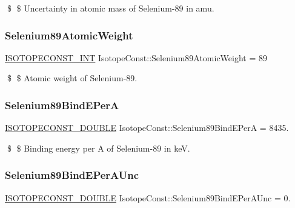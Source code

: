 \$ \$ Uncertainty in atomic mass of Selenium-\/89 in amu. \mbox{\label{group___isotope_const-_selenium-_se89_ga8724654abe1d83f8700c4d31b4a57be4}} 
\subsubsection{\texorpdfstring{Selenium89\+Atomic\+Weight}{Selenium89AtomicWeight}}
{\footnotesize\ttfamily \mbox{\hyperlink{group___isotope_const-_macros_ga5f18360b3e99483a35c32d789e62621c}{I\+S\+O\+T\+O\+P\+E\+C\+O\+N\+S\+T\+\_\+\+I\+NT}} Isotope\+Const\+::\+Selenium89\+Atomic\+Weight = 89}

\$ \$ Atomic weight of Selenium-\/89. \mbox{\label{group___isotope_const-_selenium-_se89_gacece702eef8cd6bc0ad04158132d684f}} 
\subsubsection{\texorpdfstring{Selenium89\+Bind\+E\+PerA}{Selenium89BindEPerA}}
{\footnotesize\ttfamily \mbox{\hyperlink{group___isotope_const-_macros_ga8f45a7272ce02c0b4c65c44636ed719a}{I\+S\+O\+T\+O\+P\+E\+C\+O\+N\+S\+T\+\_\+\+D\+O\+U\+B\+LE}} Isotope\+Const\+::\+Selenium89\+Bind\+E\+PerA = 8435.}

\$ \$ Binding energy per A of Selenium-\/89 in keV. \mbox{\label{group___isotope_const-_selenium-_se89_ga489e89ca088332f2793ba96b3a8fa16f}} 
\subsubsection{\texorpdfstring{Selenium89\+Bind\+E\+Per\+A\+Unc}{Selenium89BindEPerAUnc}}
{\footnotesize\ttfamily \mbox{\hyperlink{group___isotope_const-_macros_ga8f45a7272ce02c0b4c65c44636ed719a}{I\+S\+O\+T\+O\+P\+E\+C\+O\+N\+S\+T\+\_\+\+D\+O\+U\+B\+LE}} Isotope\+Const\+::\+Selenium89\+Bind\+E\+Per\+A\+Unc = 0.}

